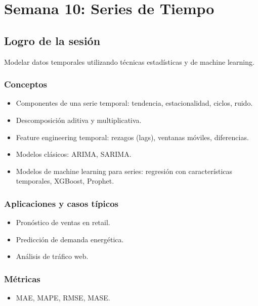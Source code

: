 \documentclass[12pt,a4paper,openany,oneside]{book}
\begin{document}
\chapter{Semana 10: Series de Tiempo}

\section{Logro de la sesión}
Modelar datos temporales utilizando técnicas estadísticas y de machine learning.

\subsection{Conceptos}
\begin{itemize}
    \item Componentes de una serie temporal: tendencia, estacionalidad, ciclos, ruido.
    \item Descomposición aditiva y multiplicativa.
    \item Feature engineering temporal: rezagos (lags), ventanas móviles, diferencias.
    \item Modelos clásicos: ARIMA, SARIMA.
    \item Modelos de machine learning para series: regresión con características temporales, XGBoost, Prophet.
\end{itemize}

\subsection{Aplicaciones y casos típicos}
\begin{itemize}
    \item Pronóstico de ventas en retail.
    \item Predicción de demanda energética.
    \item Análisis de tráfico web.
\end{itemize}

\subsection{Métricas}
\begin{itemize}
    \item MAE, MAPE, RMSE, MASE.
\end{itemize}
\end{document}
